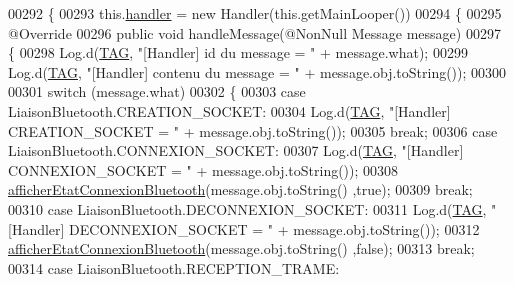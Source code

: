 \begin{DoxyCode}
00292     \{
00293         this.\hyperlink{classcom_1_1example_1_1area_1_1_i_h_m_gestion_partie_ace8429e695c3e7d695ba98bf2dcd66f2}{handler} = \textcolor{keyword}{new} Handler(this.getMainLooper())
00294         \{
00295             @Override
00296             \textcolor{keyword}{public} \textcolor{keywordtype}{void} handleMessage(@NonNull Message message)
00297             \{
00298                 Log.d(\hyperlink{classcom_1_1example_1_1area_1_1_i_h_m_gestion_partie_a78af1eb84e4a48b7f69c3ebee193933c}{TAG}, \textcolor{stringliteral}{"[Handler] id du message = "} + message.what);
00299                 Log.d(\hyperlink{classcom_1_1example_1_1area_1_1_i_h_m_gestion_partie_a78af1eb84e4a48b7f69c3ebee193933c}{TAG}, \textcolor{stringliteral}{"[Handler] contenu du message = "} + message.obj.toString());
00300 
00301                 \textcolor{keywordflow}{switch} (message.what)
00302                 \{
00303                     \textcolor{keywordflow}{case} LiaisonBluetooth.CREATION\_SOCKET:
00304                         Log.d(\hyperlink{classcom_1_1example_1_1area_1_1_i_h_m_gestion_partie_a78af1eb84e4a48b7f69c3ebee193933c}{TAG}, \textcolor{stringliteral}{"[Handler] CREATION\_SOCKET = "} + message.obj.toString());
00305                         \textcolor{keywordflow}{break};
00306                     \textcolor{keywordflow}{case} LiaisonBluetooth.CONNEXION\_SOCKET:
00307                         Log.d(\hyperlink{classcom_1_1example_1_1area_1_1_i_h_m_gestion_partie_a78af1eb84e4a48b7f69c3ebee193933c}{TAG}, \textcolor{stringliteral}{"[Handler] CONNEXION\_SOCKET = "} + message.obj.toString());
00308                         \hyperlink{classcom_1_1example_1_1area_1_1_i_h_m_gestion_partie_a73fa6d212cf9c5e4dc8fadc96d8d35e9}{afficherEtatConnexionBluetooth}(message.obj.toString()
      ,\textcolor{keyword}{true});
00309                         \textcolor{keywordflow}{break};
00310                     \textcolor{keywordflow}{case} LiaisonBluetooth.DECONNEXION\_SOCKET:
00311                         Log.d(\hyperlink{classcom_1_1example_1_1area_1_1_i_h_m_gestion_partie_a78af1eb84e4a48b7f69c3ebee193933c}{TAG}, \textcolor{stringliteral}{"[Handler] DECONNEXION\_SOCKET = "} + message.obj.toString());
00312                         \hyperlink{classcom_1_1example_1_1area_1_1_i_h_m_gestion_partie_a73fa6d212cf9c5e4dc8fadc96d8d35e9}{afficherEtatConnexionBluetooth}(message.obj.toString()
      ,\textcolor{keyword}{false});
00313                         \textcolor{keywordflow}{break};
00314                     \textcolor{keywordflow}{case} LiaisonBluetooth.RECEPTION\_TRAME:

\end{DoxyCode}
